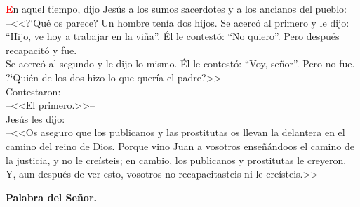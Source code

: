 \documentclass[12pt, letterpaper]{report}
\begin{document}
\lettrine[lines=1]{\bfseries \textcolor{red}{E}}{}\Large n aquel tiempo, dijo Jes\'us a los sumos sacerdotes y a los ancianos del pueblo:\\
--<<?`Qu\'e os parece? Un hombre ten\'ia dos hijos. Se acerc\'o al primero y le dijo: ``Hijo, ve hoy a trabajar en la vi\~na''. \'El le contest\'o: ``No quiero''. Pero despu\'es recapacit\'o y fue.\\
Se acerc\'o al segundo y le dijo lo mismo. \'El le contest\'o: ``Voy, se\~nor''. Pero no fue.\\
?`Qui\'en de los dos hizo lo que quer\'ia el padre?>>--\\
Contestaron:\\
--<<El primero.>>--\\
Jes\'us les dijo:\\
--<<Os aseguro que los publicanos y las prostitutas os llevan la delantera en el camino del reino de Dios. Porque vino Juan a vosotros ense\~n\'andoos el camino de la justicia, y no le cre\'isteis; en cambio, los publicanos y prostitutas le creyeron. Y, aun despu\'es de ver esto, vosotros no recapacitasteis ni le cre\'isteis.>>--

{\bfseries Palabra del Se\~nor.}
\end{document}
